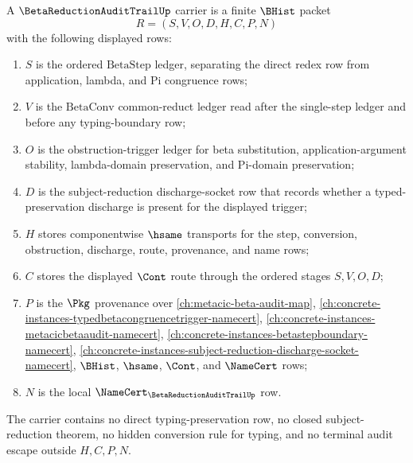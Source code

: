 \begin{definition}
\label{def:beta-reduction-audit-trail-carrier}
A $\BetaReductionAuditTrailUp$ carrier is a finite $\BHist$ packet
$$
R=(S,V,O,D,H,C,P,N)
$$
with the following displayed rows:
\begin{enumerate}
\item $S$ is the ordered $\mathrm{BetaStep}$ ledger, separating the direct
redex row from application, lambda, and Pi congruence rows;
\item $V$ is the $\mathrm{BetaConv}$ common-reduct ledger read after the
single-step ledger and before any typing-boundary row;
\item $O$ is the obstruction-trigger ledger for beta substitution,
application-argument stability, lambda-domain preservation, and Pi-domain
preservation;
\item $D$ is the subject-reduction discharge-socket row that records whether a
typed-preservation discharge is present for the displayed trigger;
\item $H$ stores componentwise $\hsame$ transports for the step, conversion,
obstruction, discharge, route, provenance, and name rows;
\item $C$ stores the displayed $\Cont$ route through the ordered stages
$S,V,O,D$;
\item $P$ is the $\Pkg$ provenance over \autoref{ch:metacic-beta-audit-map},
\autoref{ch:concrete-instances-typedbetacongruencetrigger-namecert},
\autoref{ch:concrete-instances-metacicbetaaudit-namecert},
\autoref{ch:concrete-instances-betastepboundary-namecert},
\autoref{ch:concrete-instances-subject-reduction-discharge-socket-namecert},
$\BHist$, $\hsame$, $\Cont$, and $\NameCert$ rows;
\item $N$ is the local $\NameCert_{\BetaReductionAuditTrailUp}$ row.
\end{enumerate}
The carrier contains no direct typing-preservation row, no closed
subject-reduction theorem, no hidden conversion rule for typing, and no
terminal audit escape outside $H,C,P,N$.
\end{definition}

